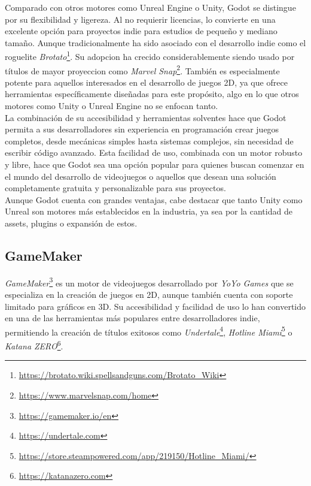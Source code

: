 Comparado con otros motores como Unreal Engine o Unity, Godot se distingue por su flexibilidad y ligereza. Al no requierir licencias, lo convierte en una excelente opción para proyectos indie para estudios de pequeño y mediano tamaño. Aunque tradicionalmente ha sido asociado con el desarrollo indie como el roguelite \textit{Brotato}\footnote{\url{https://brotato.wiki.spellsandguns.com/Brotato_Wiki}}. Su adopcion ha crecido considerablemente siendo usado por títulos de mayor proyeccion como \textit{Marvel Snap}\footnote{\url{https://www.marvelsnap.com/home}}. También es especialmente potente para aquellos interesados en el desarrollo de juegos 2D, ya que ofrece herramientas específicamente diseñadas para este propósito, algo en lo que otros motores como Unity o Unreal Engine no se enfocan tanto.\\

La combinación de su accesibilidad y herramientas solventes hace que Godot permita a sus desarrolladores sin experiencia en programación crear juegos completos, desde mecánicas simples hasta sistemas complejos, sin necesidad de escribir código avanzado. Esta facilidad de uso, combinada con un motor robusto y libre, hace que Godot sea una opción popular para quienes buscan comenzar en el mundo del desarrollo de videojuegos o aquellos que desean una solución completamente gratuita y personalizable para sus proyectos.\\

Aunque Godot cuenta con grandes ventajas, cabe destacar que tanto Unity como Unreal son motores más establecidos en la industria, ya sea por la cantidad de assets, plugins o expansión de estos.\\

\subsection{GameMaker}
\textit{GameMaker}\footnote{\url{https://gamemaker.io/en}} es un motor de videojuegos desarrollado por \textit{YoYo Games} que se especializa en la creación de juegos en 2D, aunque también cuenta con soporte limitado para gráficos en 3D. Su accesibilidad y facilidad de uso lo han convertido en una de las herramientas más populares entre desarrolladores indie, permitiendo la creación de títulos exitosos como \textit{Undertale}\footnote{\url{https://undertale.com}}, \textit{Hotline Miami}\footnote{\url{https://store.steampowered.com/app/219150/Hotline_Miami/}} o \textit{Katana ZERO}\footnote{\url{https://katanazero.com}}.\\

